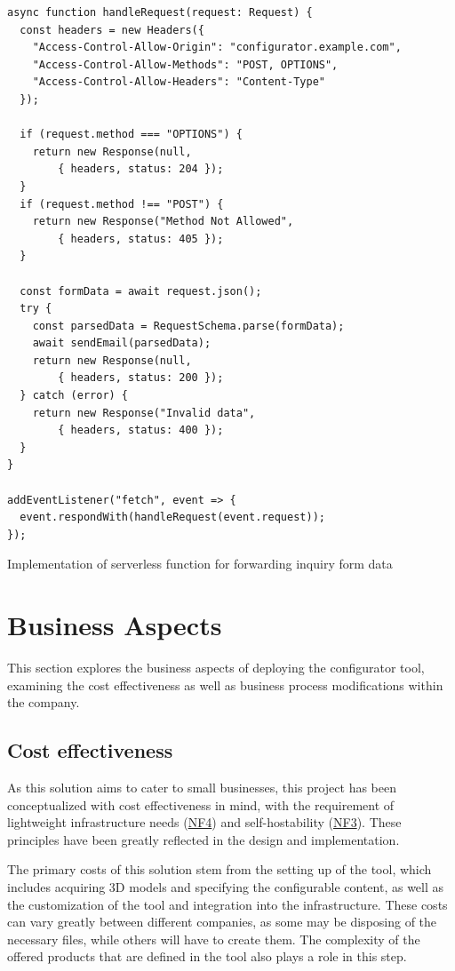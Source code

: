 \begin{listing}[h!]
\begin{verbatim}
async function handleRequest(request: Request) {
  const headers = new Headers({
    "Access-Control-Allow-Origin": "configurator.example.com",
    "Access-Control-Allow-Methods": "POST, OPTIONS",
    "Access-Control-Allow-Headers": "Content-Type"
  });

  if (request.method === "OPTIONS") {
    return new Response(null,
        { headers, status: 204 });
  }
  if (request.method !== "POST") {
    return new Response("Method Not Allowed",
        { headers, status: 405 });
  }

  const formData = await request.json();
  try {
    const parsedData = RequestSchema.parse(formData);
    await sendEmail(parsedData);
    return new Response(null, 
        { headers, status: 200 });
  } catch (error) {
    return new Response("Invalid data",
        { headers, status: 400 });
  }
}

addEventListener("fetch", event => {
  event.respondWith(handleRequest(event.request));
});
\end{verbatim}
\caption{Implementation of serverless function for forwarding inquiry form data}
\label{listing:serverless}
\end{listing}


\section{Business Aspects}

This section explores the business aspects of deploying the configurator tool, examining the cost effectiveness as well as business process modifications within the company.


\subsection{Cost effectiveness}

As this solution aims to cater to small businesses, this project has been conceptualized with cost effectiveness in mind, with the requirement of lightweight infrastructure needs (\hyperref[itm:NF4]{NF4}) and self-hostability (\hyperref[itm:NF3]{NF3}). These principles have been greatly reflected in the design and implementation.

The primary costs of this solution stem from the setting up of the tool, which includes acquiring 3D models and specifying the configurable content, as well as the customization of the tool and integration into the infrastructure. These costs can vary greatly between different companies, as some may be disposing of the necessary files, while others will have to create them. The complexity of the offered products that are defined in the tool also plays a role in this step.

